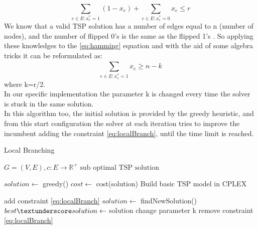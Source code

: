 \begin{equation}\label{eq:hamming}
    \sum_{e\in E: x_e^*=1}^{}(1-x_e) + \sum_{e\in E: x_e^*=0}^{}x_e \leq r
\end{equation}
We know that a valid TSP solution has a number of edges equal to n (number of nodes), and the number of flipped 0’s is the same as the flipped 1’s . So applying these knowledges to the \ref{eq:hamming} equation and with the aid of some algebra tricks it can be reformulated as:
\begin{equation}\label{eq:localBranch}
    \sum_{e\in E: x_e^*=1}^{}x_e \geq n-k
\end{equation}
where k=r/2.
\\
In our specific implementation the parameter k is changed every time the solver is stuck in the same solution. \\
In this algorithm too, the initial solution is provided by the greedy heuristic, and from this start configuration the solver at each iteration tries to improve the incumbent adding the constraint \ref{eq:localBranch}, until the time limit is reached.


\begin{algorithm}
    \caption{Local Branching}\label{algo:SoftFixing}
    \begin{algorithmic}[1]
    \Require $G = (V,E), c:E \to \mathbb{R}^+$
    \Ensure $\text{sub optimal TSP solution}$

    \State $solution \gets$ greedy()
    \State $cost \gets $ cost(solution)
    \State Build basic TSP model in CPLEX



    \State add constraint \ref{eq:localBranch}
    \State $solution \gets$ findNewSolution()
    \State $ best\textunderscore solution \gets$ solution
    \State change parameter k
    \EndIf
    \State remove constraint \ref{eq:localBranch}
    \EndWhile

    \end{algorithmic}
\end{algorithm}

